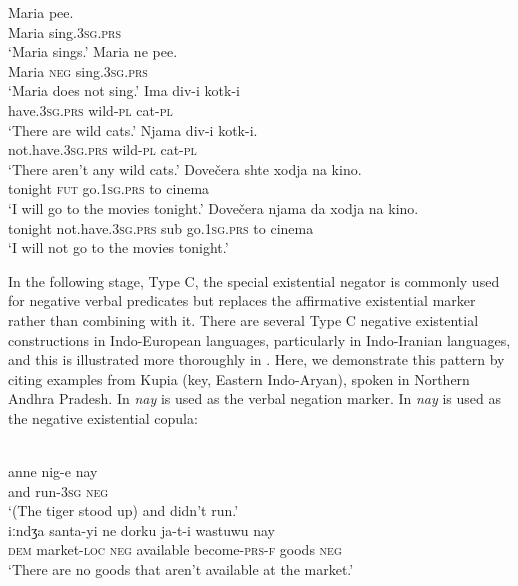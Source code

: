 ﻿\documentclass[output=paper]{langsci/langscibook}
\begin{document}
\begin{exe}\ex\label{ex:ieur-bulgarian-negators}
\begin{xlist}
\ex
    \gll Maria pee. \\
Maria sing.\textsc{3sg}.\textsc{prs} \\
    \glt `Maria sings.'
\ex
\gll Maria ne pee. \\
Maria \textsc{neg} sing.\textsc{3sg}.\textsc{prs} \\
\glt `Maria does not sing.'
\ex\gll Ima div-i kotk-i \\
   have.\textsc{3sg}.\textsc{prs} wild-\textsc{pl} cat-\textsc{pl} \\
\glt `There are wild cats.'
\ex\gll Njama div-i kotk-i. \\
not.have.\textsc{3sg}.\textsc{prs} wild-\textsc{pl} cat-\textsc{pl} \\
\glt `There aren't any wild cats.'
\ex\gll Dovečera shte xodja na kino. \\
tonight     \textsc{fut} go.\textsc{1sg}.\textsc{prs}  to cinema \\
\glt `I will go to the movies tonight.'
\ex\gll Dovečera njama                  da   xodja          na  kino.\\
tonight not.have.\textsc{3sg}.\textsc{prs} sub go.\textsc{1sg.prs} to
cinema \\
\glt `I will not go to the movies tonight.'
    \end{xlist}\end{exe}
%
In the following stage, Type C, the special existential negator is commonly
used for negative verbal predicates but replaces the affirmative
existential marker rather than combining with it. There are several Type C
negative existential constructions in Indo-European languages, particularly
in Indo-Iranian languages, and this is illustrated more thoroughly in
. Here, we demonstrate this pattern by citing
examples from Kupia (key, Eastern Indo-Aryan), spoken in Northern Andhra
Pradesh. In  \textit{nay} is used as the verbal
negation marker. In  \textit{nay} is used as the negative existential copula:
%
\begin{exe}\ex\begin{xlist}
\ex\label{ex:ieur-kupia-tiger}
\\
    \gll anne nig-e          nay \\
            and   run-\textsc{3sg}      \textsc{neg} \\
    \glt `(The tiger stood up) and didn't run.'
\ex\label{ex:ieur-kupia-market}
\\
\gll iːndʒa santa-yi ne dorku ja-t-i wastuwu nay\\
    \textsc{dem}     market-\textsc{loc} \textsc{neg} available
    become-\textsc{prs-f}
goods      \textsc{neg}\\
\glt `There are no goods that aren't available at the market.'
\end{xlist}\end{exe}
\end{document}

